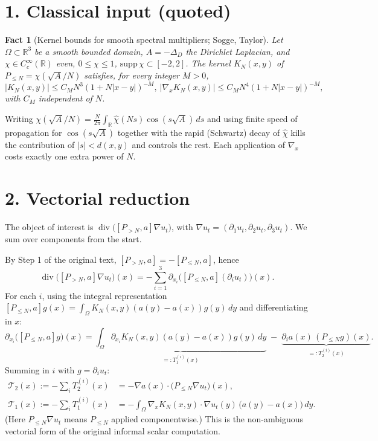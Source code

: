 \documentclass[11pt,letterpaper]{amsart}
\newcommand{\dive}{\operatorname{div}}
\newtheorem{fact}[theorem]{Fact}
\begin{document}
\section*{1. Classical input (quoted)}

\begin{fact}[Kernel bounds for smooth spectral multipliers; Sogge, Taylor]\label{fact:kernel}
Let $\Omega \subset \mathbb{R}^3$ be a smooth bounded domain, $A = -\Delta_D$ the Dirichlet Laplacian, and $\chi \in C_c^\infty(\mathbb{R})$ even, $0 \le \chi \le 1$, $\mathrm{supp}\,\chi \subset [-2,2]$. The kernel $K_N(x,y)$ of $P_{\le N} = \chi(\sqrt{A}/N)$ satisfies, for every integer $M > 0$,
\begin{equation}\label{eq:kernel_fact}
|K_N(x,y)| \le C_M N^3 (1+N|x-y|)^{-M},~
|\nabla_x K_N(x,y)| \le C_M N^4 (1+N|x-y|)^{-M},
\end{equation}
with $C_M$ independent of $N$.
\end{fact}

 Writing $\chi(\sqrt{A}/N) = \frac{N}{2\pi}\int_{\mathbb{R}} \hat\chi(Ns)\cos(s\sqrt{A})\,ds$ and using finite speed of propagation for $\cos(s\sqrt{A})$ together with the rapid (Schwartz) decay of $\hat\chi$ kills the contribution of $|s| < d(x,y)$ and controls the rest. Each application of $\nabla_x$ costs exactly one extra power of $N$.

\section*{2. Vectorial reduction}

The object of interest is $\dive\big([P_{>N},a]\nabla u_t\big)$, with $\nabla u_t = (\partial_1 u_t, \partial_2 u_t, \partial_3 u_t)$. We sum over components from the start.

By Step 1 of the original text, $[P_{>N},a] = -[P_{\le N},a]$, hence
\[
\dive\big([P_{>N},a]\nabla u_t\big)(x) = -\sum_{i=1}^3 \partial_{x_i}\Big( [P_{\le N},a](\partial_i u_t) \Big)(x).
\]
For each $i$, using the integral representation $[P_{\le N},a]g(x) = \int_\Omega K_N(x,y)(a(y)-a(x))g(y)\,dy$ and differentiating in $x$:
\[
\partial_{x_i}\big([P_{\le N},a]g\big)(x) =
\underbrace{\int_\Omega \partial_{x_i}K_N(x,y)(a(y)-a(x))g(y)\,dy}_{=:T_1^{(i)}(x)}
\;-\;
\underbrace{\partial_i a(x)\,(P_{\le N}g)(x)}_{=:T_2^{(i)}(x)}.
\]
Summing in $i$ with $g = \partial_i u_t$:
\begin{align}
\mathcal T_2(x) :=-\sum_i T_2^{(i)}(x) &= -\nabla a(x)\cdot \big(P_{\le N}\nabla u_t\big)(x), \label{eq:T2vec}\\
\mathcal T_1(x) :=-\sum_i T_1^{(i)}(x) &= -\int_\Omega \nabla_x K_N(x,y)\cdot \nabla u_t(y)\,\big(a(y)-a(x)\big)\,dy. \label{eq:T1vec}
\end{align}
(Here $P_{\le N}\nabla u_t$ means $P_{\le N}$ applied componentwise.) This is the non-ambiguous vectorial form of the original informal scalar computation.
\end{document}
